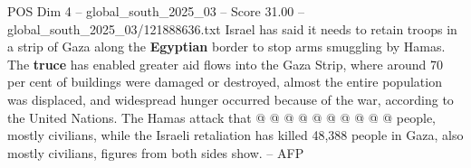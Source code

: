 \begin{textsample}{POS Dim 4 – global\_south\_2025\_03 – Score 31.00 – global\_south\_2025\_03/121888636.txt}
Israel has said it needs to retain troops in a strip of Gaza along the \textbf{Egyptian} border to stop arms smuggling by Hamas.
The \textbf{truce} has enabled greater aid flows into the Gaza Strip, where around 70 per cent of buildings were damaged or destroyed, almost the entire population was displaced, and widespread hunger occurred because of the war, according to the United Nations.
The Hamas attack that @ @ @ @ @ @ @ @ @ @ people, mostly civilians, while the Israeli retaliation has killed 48,388 people in Gaza, also mostly civilians, figures from both sides show. -- AFP

\end{textsample}
